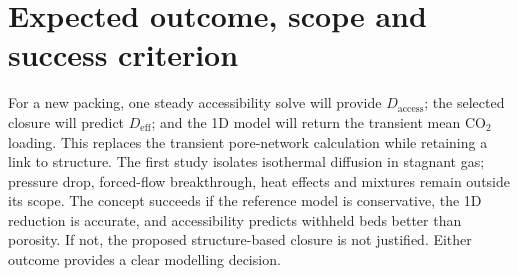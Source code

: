 \documentclass[10pt,a4paper]{article}
\begin{document}
\section{Expected outcome, scope and success criterion}
For a new packing, one steady accessibility solve will provide
$D_{\mathrm{access}}$; the selected closure will predict $D_{\mathrm{eff}}$;
and the 1D model will return the transient mean CO$_2$ loading. This replaces
the transient pore-network calculation while retaining a link to structure.
The first study isolates isothermal diffusion in stagnant gas; pressure drop,
forced-flow breakthrough, heat effects and mixtures remain outside its scope.
The concept succeeds if the reference model is conservative, the 1D reduction
is accurate, and accessibility predicts withheld beds better than porosity. If
not, the proposed structure-based closure is not justified. Either outcome
provides a clear modelling decision.
\end{document}
